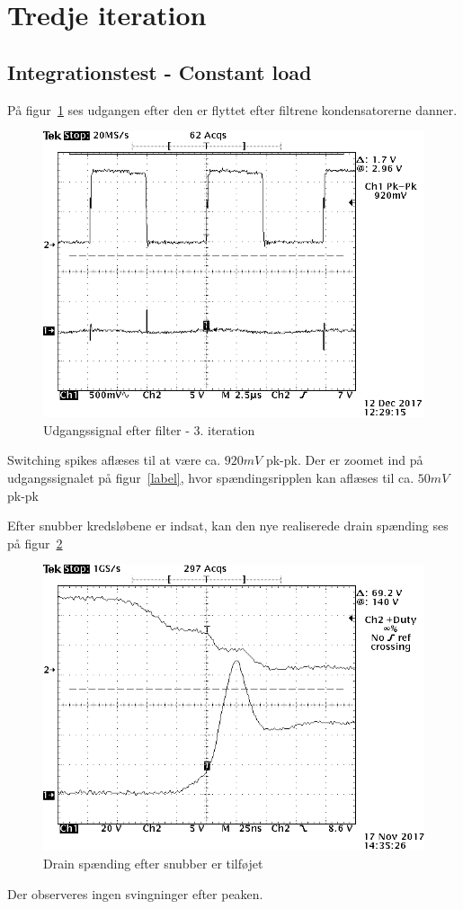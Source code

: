 \section{Tredje iteration}

\subsection{Integrationstest - Constant load}
På figur~\ref{fig:realisering_udgang_e_filter_3} ses udgangen efter den er flyttet efter filtrene kondensatorerne danner. 
\begin{figure}[H]
	\center
	\includegraphics[max width=0.7\linewidth]{../dokumentation/tex/3iteration/billeder/Realisering/udgang_e_filter_3iteration.png}
	\caption{Udgangssignal efter filter - 3. iteration}
	\label{fig:realisering_udgang_e_filter_3}
\end{figure}
Switching spikes aflæses til at være ca. $920mV$ pk-pk.
Der er zoomet ind på udgangssignalet på figur~\ref{label}, hvor spændingsripplen kan aflæses til ca. $50mV$ pk-pk

Efter snubber kredsløbene er indsat, kan den nye realiserede drain spænding ses på figur~\ref{fig:realiseirng_snubber_MOSFET_3} 
\begin{figure}[H]
	\center
	\includegraphics[max width=0.7\linewidth]{../dokumentation/tex/3iteration/billeder/Realisering/Realisering_switch_tid.PNG}
	\caption{Drain spænding efter snubber er tilføjet}
	\label{fig:realiseirng_snubber_MOSFET_3}
\end{figure} 
Der observeres ingen svingninger efter peaken.

